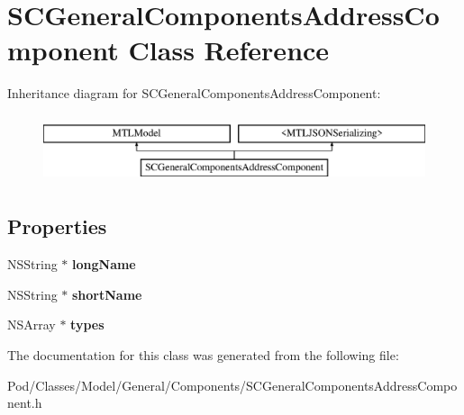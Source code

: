 \hypertarget{interface_s_c_general_components_address_component}{}\section{S\+C\+General\+Components\+Address\+Component Class Reference}
\label{interface_s_c_general_components_address_component}
Inheritance diagram for S\+C\+General\+Components\+Address\+Component\+:\begin{figure}[H]
\begin{center}
\leavevmode
\includegraphics[height=2.000000cm]{interface_s_c_general_components_address_component}
\end{center}
\end{figure}
\subsection*{Properties}
\begin{DoxyCompactItemize}
\item 
N\+S\+String $\ast$ {\bfseries long\+Name}\hypertarget{interface_s_c_general_components_address_component_a16261f2c2428e11c27a52d3fcba907e6}{}\label{interface_s_c_general_components_address_component_a16261f2c2428e11c27a52d3fcba907e6}

\item 
N\+S\+String $\ast$ {\bfseries short\+Name}\hypertarget{interface_s_c_general_components_address_component_af8a874526b559c4f4d92836992e606a4}{}\label{interface_s_c_general_components_address_component_af8a874526b559c4f4d92836992e606a4}

\item 
N\+S\+Array $\ast$ {\bfseries types}\hypertarget{interface_s_c_general_components_address_component_a57e579ea0cb6879a4d679eb66bf4c2ac}{}\label{interface_s_c_general_components_address_component_a57e579ea0cb6879a4d679eb66bf4c2ac}

\end{DoxyCompactItemize}


The documentation for this class was generated from the following file\+:\begin{DoxyCompactItemize}
\item 
Pod/\+Classes/\+Model/\+General/\+Components/S\+C\+General\+Components\+Address\+Component.\+h\end{DoxyCompactItemize}
